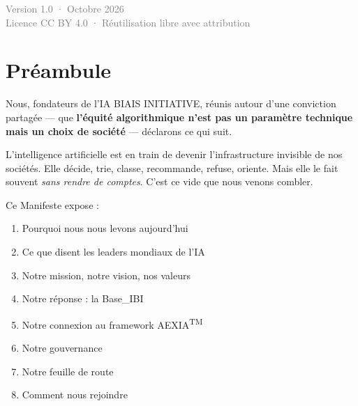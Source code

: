 \documentclass[11pt,a4paper,openany]{book}
\begin{document}
\begin{titlepage}
\vspace{1cm}

{\small\textcolor{gray}{
  Version 1.0 · Octobre 2026\\
  Licence CC BY 4.0 · Réutilisation libre avec attribution
}}

\end{titlepage}

\frontmatter
\tableofcontents
\clearpage

\chapter*{Préambule}

Nous, fondateurs de l'IA BIAIS INITIATIVE, réunis autour d'une conviction partagée — que \textbf{l'équité algorithmique n'est pas un paramètre technique mais un choix de société} — déclarons ce qui suit.

\vspace{0.3cm}

\begin{ideabox}
L'intelligence artificielle est en train de devenir l'infrastructure invisible de nos sociétés. Elle décide, trie, classe, recommande, refuse, oriente. Mais elle le fait souvent \emph{sans rendre de comptes}. C'est ce vide que nous venons combler.
\end{ideabox}

\vspace{0.3cm}

Ce Manifeste expose :
\begin{enumerate}[leftmargin=1.5em]
  \item Pourquoi nous nous levons aujourd'hui
  \item Ce que disent les leaders mondiaux de l'IA
  \item Notre mission, notre vision, nos valeurs
  \item Notre réponse : la Base\_IBI
  \item Notre connexion au framework AEXIA\textsuperscript{TM}
  \item Notre gouvernance
  \item Notre feuille de route
  \item Comment nous rejoindre
\end{enumerate}
\end{document}

